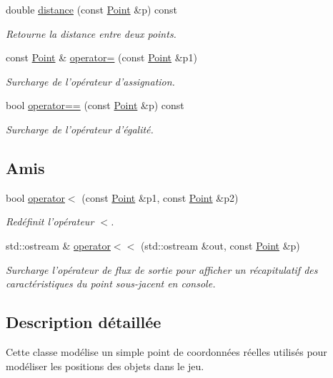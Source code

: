 \begin{DoxyCompactItemize}
double \hyperlink{classPoint_a61651e744a578356e2296e7935e858d7}{distance} (const \hyperlink{classPoint}{Point} \&p) const 
\begin{DoxyCompactList}\small\item\em Retourne la distance entre deux points. \end{DoxyCompactList}\item 
const \hyperlink{classPoint}{Point} \& \hyperlink{classPoint_a1436b60e581a48190621810f2a4d29cb}{operator=} (const \hyperlink{classPoint}{Point} \&p1)
\begin{DoxyCompactList}\small\item\em Surcharge de l'opérateur d'assignation. \end{DoxyCompactList}\item 
bool \hyperlink{classPoint_a2a6b68cd301437368de443687fc2a9f1}{operator==} (const \hyperlink{classPoint}{Point} \&p) const 
\begin{DoxyCompactList}\small\item\em Surcharge de l'opérateur d'égalité. \end{DoxyCompactList}\end{DoxyCompactItemize}
\subsection*{Amis}
\begin{DoxyCompactItemize}
\item 
bool \hyperlink{classPoint_aea03821811d00d0a252f7d845b3cf4a5}{operator$<$} (const \hyperlink{classPoint}{Point} \&p1, const \hyperlink{classPoint}{Point} \&p2)
\begin{DoxyCompactList}\small\item\em Redéfinit l'opérateur $<$. \end{DoxyCompactList}\item 
std\+::ostream \& \hyperlink{classPoint_aa818efa680e0d94ce91173ccb4b7aa08}{operator$<$$<$} (std\+::ostream \&out, const \hyperlink{classPoint}{Point} \&p)
\begin{DoxyCompactList}\small\item\em Surcharge l'opérateur de flux de sortie pour afficher un récapitulatif des caractéristiques du point sous-\/jacent en console. \end{DoxyCompactList}\end{DoxyCompactItemize}


\subsection{Description détaillée}
Cette classe modélise un simple point de coordonnées réelles utilisés pour modéliser les positions des objets dans le jeu. 

